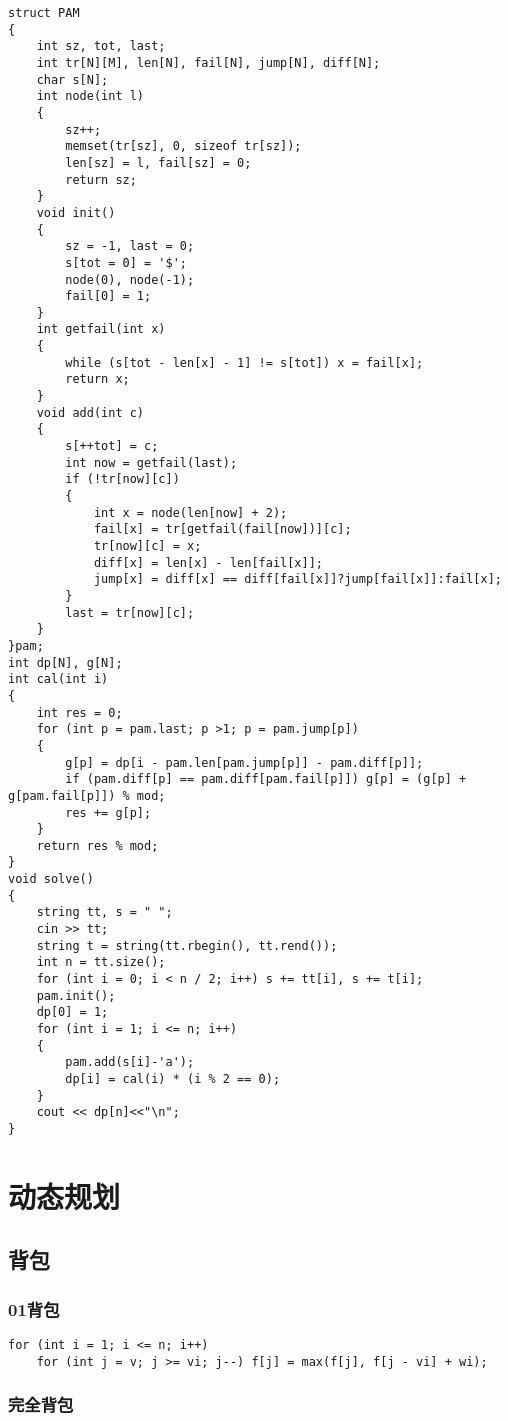 \documentclass[a4paper, fontset=none]{ctexart}
\begin{document}
\begin{verbatim}
struct PAM
{
    int sz, tot, last;
    int tr[N][M], len[N], fail[N], jump[N], diff[N];
    char s[N];
    int node(int l)
    {
        sz++;
        memset(tr[sz], 0, sizeof tr[sz]);
        len[sz] = l, fail[sz] = 0;
        return sz;
    }
    void init()
    {
        sz = -1, last = 0;
        s[tot = 0] = '$';
        node(0), node(-1);
        fail[0] = 1;
    }
    int getfail(int x)
    {
        while (s[tot - len[x] - 1] != s[tot]) x = fail[x];
        return x;
    }
    void add(int c)
    {
        s[++tot] = c;
        int now = getfail(last);
        if (!tr[now][c])
        {
            int x = node(len[now] + 2);
            fail[x] = tr[getfail(fail[now])][c];
            tr[now][c] = x;
            diff[x] = len[x] - len[fail[x]];
            jump[x] = diff[x] == diff[fail[x]]?jump[fail[x]]:fail[x];
        }
        last = tr[now][c];
    }
}pam;
int dp[N], g[N];
int cal(int i)
{
    int res = 0;
    for (int p = pam.last; p >1; p = pam.jump[p])
    {
        g[p] = dp[i - pam.len[pam.jump[p]] - pam.diff[p]];
        if (pam.diff[p] == pam.diff[pam.fail[p]]) g[p] = (g[p] + g[pam.fail[p]]) % mod;
        res += g[p];
    }
    return res % mod;
}
void solve()
{
    string tt, s = " ";
    cin >> tt;
    string t = string(tt.rbegin(), tt.rend());
    int n = tt.size();
    for (int i = 0; i < n / 2; i++) s += tt[i], s += t[i];
    pam.init();
    dp[0] = 1;
    for (int i = 1; i <= n; i++)
    {
        pam.add(s[i]-'a');
        dp[i] = cal(i) * (i % 2 == 0);
    }
    cout << dp[n]<<"\n";
}
\end{verbatim}

\section{动态规划}
\subsection{背包}
\subsubsection{01背包}

\begin{verbatim}
for (int i = 1; i <= n; i++)
    for (int j = v; j >= vi; j--) f[j] = max(f[j], f[j - vi] + wi);
\end{verbatim}
\subsubsection{完全背包}
\end{document}
